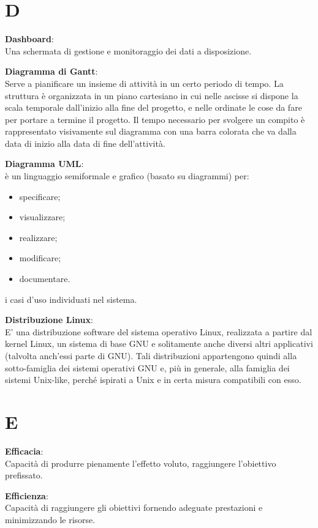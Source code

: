 \documentclass[a4paper, oneside, openany, dvipsnames, table]{article}
\begin{document}
\newpage
\section{D}
\textbf{Dashboard}:	\\Una schermata di gestione e monitoraggio dei dati a disposizione.

\textbf{Diagramma di Gantt}:\\	Serve a pianificare un insieme di attività in un certo periodo di tempo. La struttura è organizzata in un piano cartesiano in cui nelle ascisse si dispone la scala temporale dall’inizio alla fine del progetto, e nelle ordinate le cose da fare per portare a termine il progetto. Il tempo necessario per svolgere un compito è rappresentato visivamente sul diagramma con una barra colorata che va dalla data di inizio alla data di fine dell’attività.

\textbf{Diagramma UML}:\\è un linguaggio semiformale e grafico (basato su diagrammi) per:
\begin{itemize}
\item specificare;
\item visualizzare;
\item realizzare;
\item modificare;
\item documentare.
\end{itemize}
i casi d'uso individuati nel sistema.

\textbf{Distribuzione Linux}:\\	E' una distribuzione software del sistema operativo Linux, realizzata a partire dal kernel Linux, un sistema di base GNU e solitamente anche diversi altri applicativi (talvolta anch'essi parte di GNU). Tali distribuzioni appartengono quindi alla sotto-famiglia dei sistemi operativi GNU e, più in generale, alla famiglia dei sistemi Unix-like, perché ispirati a Unix e in certa misura compatibili con esso.


\newpage
\section{E}
\textbf{Efficacia}:\\	Capacità di produrre pienamente l’effetto voluto, raggiungere l'obiettivo prefissato.

\textbf{Efficienza}:\\	Capacità di raggiungere gli obiettivi fornendo adeguate prestazioni e minimizzando le risorse.
\end{document}
